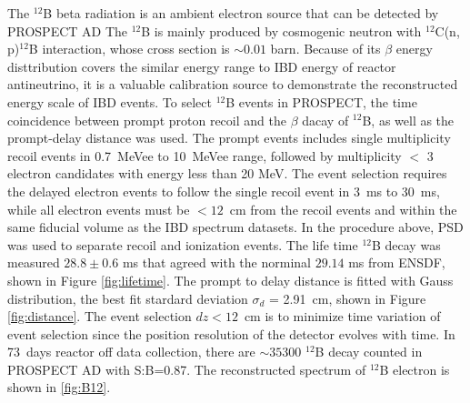 The $^{12}$B beta radiation is an ambient electron source that can be detected by PROSPECT AD
The $^{12}$B is mainly produced by cosmogenic neutron with $^{12}$C(n, p)$^{12}$B interaction, whose cross section is $\sim 0.01$ barn. 
Because of its $\beta$ energy disttribution covers the similar energy range to IBD energy of reactor antineutrino, it is a valuable calibration source to demonstrate the reconstructed energy scale of IBD events.
To select $^{12}$B events in PROSPECT, the time coincidence between prompt proton recoil and the $\beta$ dacay of $^{12}$B, as well as the prompt-delay distance was used. 
The prompt events includes single multiplicity recoil events in 0.7~MeVee to 10~MeVee range, followed by multiplicity $<$ 3  electron candidates with energy less than 20 MeV.
The event selection requires the delayed electron events to follow the single recoil event in 3~ms to 30~ms, while all electron events must be $<12$~cm from the recoil events and within the same fiducial volume as the IBD spectrum datasets.
In the procedure above, PSD was used to separate recoil and ionization events. The life time $^{12}$B decay was measured  $28.8\pm0.6$ ms that agreed with the norminal $29.14$ ms from ENSDF, shown in Figure \ref{fig:lifetime}. 
The prompt to delay distance is fitted with Gauss distribution, the best fit stardard deviation $\sigma_d$ = 2.91~cm, shown in Figure \ref{fig:distance}. 
The event selection $dz < 12$~cm is to minimize time variation of event selection since the position resolution of the detector evolves with time.
In 73~days reactor off data collection, there are $\sim 35300$ $^{12}$B decay counted in PROSPECT AD with S:B=0.87. 
The reconstructed spectrum of $^{12}$B electron is shown in \ref{fig:B12}.
